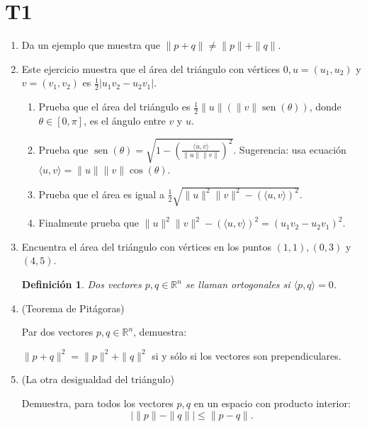 \documentclass{article}
\newtheorem{definicion}{Definici\'on}
\theoremstyle{definition}
\newcommand{\sen}{\operatorname{sen}}
\begin{document}
  \section*{T1}

	\begin{enumerate}

		\item Da un ejemplo que muestra que $\|p+q\|\ne \|p\|+\|q\|$.	


 \item Este ejercicio muestra que el \'area del tri\'angulo con v\'ertices  $0, u=(u_1,u_2)$ y $v=(v_1,v_2)$
       es $\frac{1}{2}|u_1v_2-u_2v_1|$.
       \begin{enumerate}
       \item Prueba que el \'area del tri\'angulo es $\frac{1}{2}\|u\|(\|v\| \sen(\theta))$,
         donde $\theta\in [0,\pi]$, es el \'angulo entre $v$ y $u$.
       \item Prueba que $\sen(\theta)=\sqrt{1- \left( \frac{\langle u , v \rangle }{\|u\|\|v\|} \right)^2}$.
       Sugerencia: usa ecuaci\'on $\langle u, v \rangle=\|u\|\|v\|\cos(\theta)$.
       \item Prueba que el \'area es igual a $\frac{1}{2}\sqrt{\|u\|^2\|v\|^2-(\langle u,  v\rangle )^2}$.
       \item Finalmente prueba que $\|u\|^2\|v\|^2-(\langle u,  v\rangle )^2=(u_1v_2-u_2v_1)^2$.
       \end{enumerate}
       
        \item Encuentra el \'area del tri\'angulo con v\'ertices en los puntos $(1,1), (0,3)$ y $(4,5)$.
	
	
         \begin{definicion}
           Dos vectores $p,q\in \mathbb{R}^n$ se llaman ortogonales si $\langle p,q \rangle=0$.
         \end{definicion}
         
         
       \item (Teorema de Pit\'agoras)

         Par dos vectores $p, q \in \mathbb{R}^n$, demuestra:

         $\|p+q\|^2=\|p\|^2+\|q\|^2$ si y s\'olo si los vectores son prependiculares.

 \item (La otra desigualdad del tri\'angulo)

                Demuestra, para todos  los vectores $p,q$ en un espacio con producto interior:
                $$
                |\|p\| - \|q\|| \leq \|p-q\|.
                $$


\end{enumerate}
\end{document}
